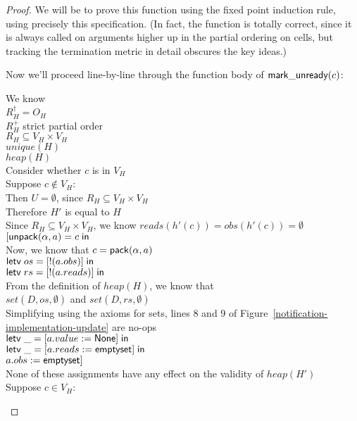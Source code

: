 \begin{proof}
We will be to prove this function using the fixed point induction
rule, using precisely this specification. (In fact, the function is
totally correct, since it is always called on arguments higher up in
the partial ordering on cells, but tracking the termination metric in
detail obscures the key ideas.)

Now we'll proceed line-by-line through the function body of $\mathsf{mark\_unready}(c)$: 

\begin{tabbedproof}
\oo We know \\
\oox $R^\dagger_H = O_H$ \\
\oox $R^+_H$ strict partial order \\
\oox $R_H \subseteq V_H \times V_H$ \\
\oox $\mathit{unique}(H)$ \\
\oox $\mathit{heap}(H)$ \\
\ooo Consider whether $c$ is in $V_H$ \\
\ooo Suppose $c \not\in V_H$: \\
\oooo Then $U = \emptyset$, since $R_H \subseteq V_H \times V_H$ \\ 
\oooo Therefore $H'$ is equal to $H$ \\
\oooo Since $R_H \subseteq V_H \times V_H$, we know $\mathit{reads}(h'(c)) = \mathit{obs}(h'(c)) = \emptyset$ \\
\oooo $[\mathsf{unpack}({\alpha}, {a}) = {c} \;\mathsf{in}\;{}$ \\
\oooo Now, we know that $c = \mathsf{pack}({\alpha}, {a})$ \\
\oooo $\mathsf{letv}\;os = [!(a.obs)]\;\mathsf{in}\;$ \\
\oooo $\mathsf{letv}\;rs = [!(a.reads)]\;\mathsf{in}\;$ \\
\oooo From the definition of $\mathit{heap}(H)$, we know that  \\
\oooo $\mathit{set}(D, os, \emptyset)$ and $\mathit{set}(D, rs, \emptyset)$ \\
\oooo Simplifying using the axioms for sets, lines 8 and 9 of Figure~\ref{notification-implementation-update} are no-ops \\
\oooo $\mathsf{letv}\;\_ = [a.value := \mathsf{None}]\;\mathsf{in}\;$ \\
\oooo $\mathsf{letv}\;\_ = [a.reads := \mathsf{emptyset}]\;\mathsf{in}\;$ \\
\oooo $a.obs := \mathsf{emptyset}]$ \\
\oooo None of these assignments have any effect on the validity of $\mathit{heap}(H')$ \\
\ooo Suppose $c \in V_H$: \\

\end{tabbedproof}
\end{proof}
